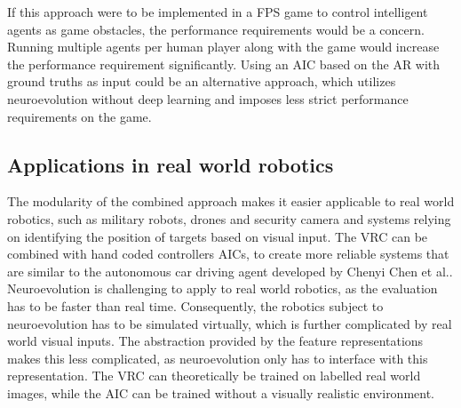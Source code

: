 If this approach were to be implemented in a FPS game to control intelligent agents as game obstacles, the performance requirements would be a concern. Running multiple agents per human player along with the game would increase the performance requirement significantly. Using an AIC based on the AR with ground truths as input could be an alternative approach, which utilizes neuroevolution without deep learning and imposes less strict performance requirements on the game.

\subsection{Applications in real world robotics}
The modularity of the combined approach makes it easier applicable to real world robotics, such as military robots, drones and security camera and systems relying on identifying the position of targets based on visual input. The VRC can be combined with hand coded controllers AICs, to create more reliable systems that are similar to the autonomous car driving agent developed by Chenyi Chen et al.\cite{chen}. Neuroevolution is challenging to apply to real world robotics, as the evaluation has to be faster than real time. Consequently, the robotics subject to neuroevolution has to be simulated virtually, which is further complicated by real world visual inputs. The abstraction provided by the feature representations makes this less complicated, as neuroevolution only has to interface with this representation. The VRC can theoretically be trained on labelled real world images, while the AIC can be trained without a visually realistic environment.